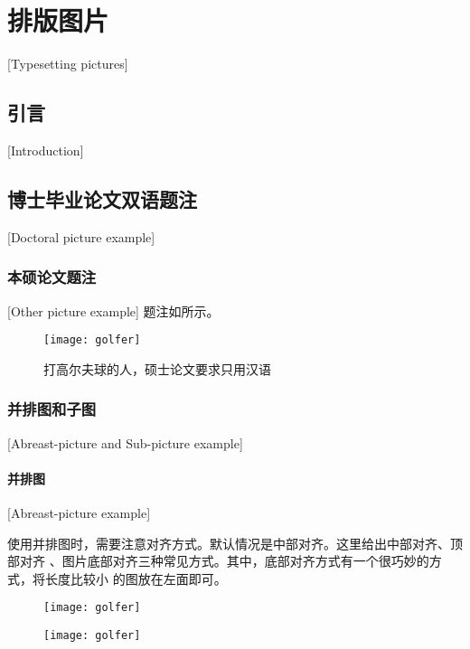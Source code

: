 
\chapter{排版图片}[Typesetting pictures]

\section{引言}[Introduction]

\section{博士毕业论文双语题注}[Doctoral picture example]


\subsection{本硕论文题注}[Other picture example]
题注如所示。

\begin{figure}[ht]
	\centering
	\texttt{[image: golfer]}
	\caption{打高尔夫球的人，硕士论文要求只用汉语}
	\label{fig:bm}
\end{figure}

\subsection{并排图和子图}[Abreast-picture and Sub-picture example]
\subsubsection{并排图}[Abreast-picture example]

使用并排图时，需要注意对齐方式。默认情况是中部对齐。这里给出中部对齐、顶部对齐
、图片底部对齐三种常见方式。其中，底部对齐方式有一个很巧妙的方式，将长度比较小
的图放在左面即可。

\lipsum[2]


\begin{figure}[htbp]
	\centering
	\begin{minipage}{0.4\textwidth}
		\centering
		\texttt{[image: golfer]} 
	\end{minipage}
	\centering
	\begin{minipage}{0.4\textwidth}
		\centering
		\texttt{[image: golfer]}
	\end{minipage}
\end{figure}

